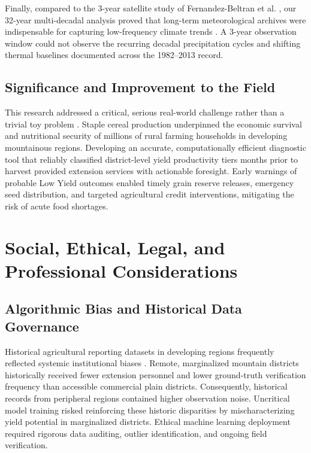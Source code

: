 \documentclass[conference]{IEEEtran}
\begin{document}
Finally, compared to the 3-year satellite study of Fernandez-Beltran et al. \cite{fernandez2021}, our 32-year multi-decadal analysis proved that long-term meteorological archives were indispensable for capturing low-frequency climate trends \cite{lobell2008}. A 3-year observation window could not observe the recurring decadal precipitation cycles and shifting thermal baselines documented across the 1982--2013 record.

\subsection{Significance and Improvement to the Field}
This research addressed a critical, serious real-world challenge rather than a trivial toy problem \cite{dhakal2023, lobell2008}. Staple cereal production underpinned the economic survival and nutritional security of millions of rural farming households in developing mountainous regions. Developing an accurate, computationally efficient diagnostic tool that reliably classified district-level yield productivity tiers months prior to harvest provided extension services with actionable foresight. Early warnings of probable Low Yield outcomes enabled timely grain reserve releases, emergency seed distribution, and targeted agricultural credit interventions, mitigating the risk of acute food shortages.

\section{Social, Ethical, Legal, and Professional Considerations}

\subsection{Algorithmic Bias and Historical Data Governance}
Historical agricultural reporting datasets in developing regions frequently reflected systemic institutional biases \cite{dhakal2023}. Remote, marginalized mountain districts historically received fewer extension personnel and lower ground-truth verification frequency than accessible commercial plain districts. Consequently, historical records from peripheral regions contained higher observation noise. Uncritical model training risked reinforcing these historic disparities by mischaracterizing yield potential in marginalized districts. Ethical machine learning deployment required rigorous data auditing, outlier identification, and ongoing field verification.
\end{document}
